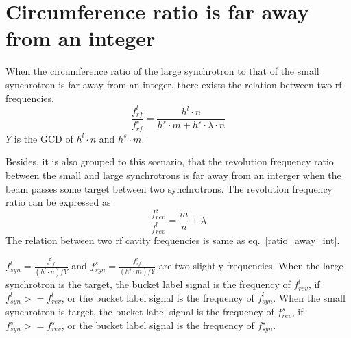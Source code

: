 \section{Circumference ratio is far away from an integer} 
When the circumference ratio of the large synchrotron to that of the small synchrotron is far away from an integer, there exists the relation between two rf frequencies. 
\begin{equation}
\label{ratio_away_int}
\frac{f_{\mathit{rf}}^{l}}{f_{\mathit{rf}}^{s}}=\frac{h^l\cdot n}{h^s \cdot m+ h^s \cdot\lambda\cdot n}
\end{equation}
$Y$ is the GCD of $h^l\cdot n$ and $h^s \cdot m$.
%
%




Besides, it is also grouped to this scenario, that the revolution frequency ratio between the small and large synchrotrons is far away from an interger when the beam passes some target between two synchrotrons. The revolution frequency ratio can be expressed as
\begin{equation} 
\frac{f_{\mathit{rev}}^{s}}{f_{\mathit{rev}}^{l}}=\frac{m}{n}+ \lambda\label{close_to_interger2}
\end{equation}
The relation between two rf cavity frequencies is same as eq.~\ref{ratio_away_int}.

$f_{\mathit{syn}}^{l}=\frac{f_{\mathit{rf}}^{l}}{(h^l\cdot n)/Y}$ and $f_{\mathit{syn}}^{s}=\frac{f_{\mathit{rf}}^{s}}{(h^s\cdot m)/Y}$ are two slightly frequencies. When the large synchrotron is the target, the bucket label signal is the frequency of $f_{\mathit{rev}}^{l}$, if $f_{\mathit{syn}}^{l}>=f_{\mathit{rev}}^{l}$, or the bucket label signal is the frequency of $f_{\mathit{syn}}^{l}$. When the small synchrotron is target, the bucket label signal is the frequency of $f_{\mathit{rev}}^{s}$, if $f_{\mathit{syn}}^{s}>=f_{\mathit{rev}}^{s}$, or the bucket label signal is the frequency of $f_{\mathit{syn}}^{s}$. 

